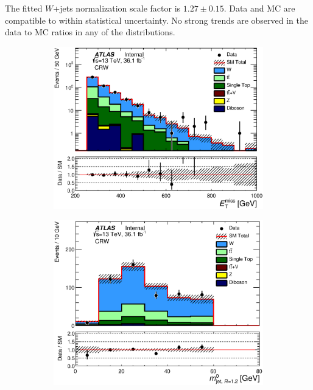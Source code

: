 \indent  The fitted $W$+jets normalization scale factor is $1.27 \pm 0.15$.  Data and MC are compatible to within statistical uncertainty.  No strong trends are observed in the data to MC ratios in any of the distributions. \\

\begin{figure}[!h]
  \centering
      \begin{subfigure}[b]{0.40\textwidth}    
  \includegraphics[width=\textwidth]{figures/wJets/postfit/Met_CRW_log.eps}
                \caption{ }
    \end{subfigure}
      \begin{subfigure}[b]{0.40\textwidth}    
    \includegraphics[width=\textwidth]{figures/wJets/postfit/AntiKt12M_0__CRW.eps}

\end{subfigure}
\end{figure}
